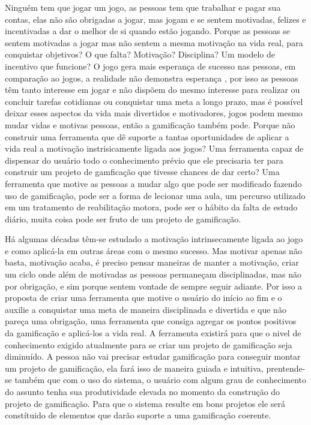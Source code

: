 Ninguém tem que jogar um jogo, as pessoas tem que trabalhar e pagar sua contas, elas não são obrigadas a jogar, mas jogam \cite{chou2015actionable} e se sentem motivadas, felizes e incentivadas a dar o melhor de si quando estão jogando. Porque as pessoas se sentem motivadas a jogar mas não sentem a mesma motivação na vida real, para conquistar objetivos? O que falta? Motivação? Disciplina? Um modelo de incentivo que funcione? O jogo gera mais esperança de sucesso nas pessoas, em comparação ao jogos, a realidade não demonstra esperança \cite{mcgonigal2011reality}, por isso as pessoas têm tanto interesse em jogar e não dispõem do mesmo interesse para realizar ou concluir tarefas cotidianas ou conquistar uma meta a longo prazo, mas é possível deixar esses aspectos da vida mais divertidos e motivadores, jogos podem mesmo mudar vidas e motivas pessoas, então a gamificação também pode. Porque não construir uma ferramenta que dê suporte a tantas oportunidades de aplicar a vida real a motivação instrisicamente ligada aos jogos? Uma ferramenta capaz de dispensar do usuário todo o conhecimento prévio que ele precisaria ter para construir um projeto de gamficação que tivesse chances de dar certo? Uma ferramenta que motive as pessoas a mudar algo que pode ser modificado fazendo uso de gamificação, pode ser a forma de lecionar uma aula, um percurso utilizado em um tratamento de reabilitação motora, pode ser o hábito da falta de estudo diário, muita coisa pode ser fruto de um projeto de gamificação.

Há algumas décadas têm-se estudado a motivação intrinsecamente ligada ao jogo e como aplicá-la em outras áreas com o mesmo sucesso\cite{chou2015actionable}. Mas motivar apenas não basta, motivação acaba, é preciso pensar maneiras de manter a motivação, criar um ciclo onde além de motivadas as pessoas permaneçam disciplinadas, mas não por obrigação, e sim porque sentem vontade de sempre seguir adiante. Por isso a proposta de criar uma ferramenta que motive o usuário do início ao fim e o auxilie a  conquistar uma meta de maneira disciplinada e divertida e que não pareça uma obrigação, uma ferramenta que consiga agregar os pontos positivos da gamificação e aplicá-los a vida real. A ferramenta existirá para que o nivel de conhecimento exigido atualmente para se criar um projeto de gamificação seja diminuído. A pessoa não vai precisar estudar gamificação para conseguir montar um projeto de gamificação, ela fará isso de maneira guiada e intuitiva, prentende-se também que com o uso do sistema, o usuário com algum grau de conhecimento do assunto tenha sua produtividade elevada no momento da construção do projeto de gamificação. Para que o sistema resulte em bons projetos ele será constítuido de elementos que darão suporte a uma gamificação coerente.





